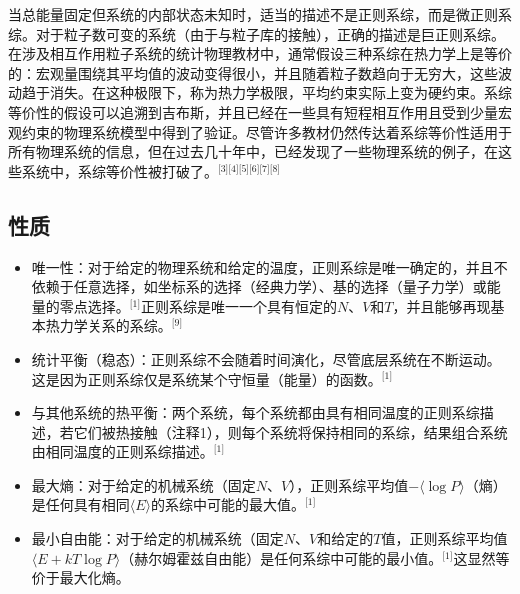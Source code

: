 当总能量固定但系统的内部状态未知时，适当的描述不是正则系综，而是微正则系综。对于粒子数可变的系统（由于与粒子库的接触），正确的描述是巨正则系综。在涉及相互作用粒子系统的统计物理教材中，通常假设三种系综在热力学上是等价的：宏观量围绕其平均值的波动变得很小，并且随着粒子数趋向于无穷大，这些波动趋于消失。在这种极限下，称为热力学极限，平均约束实际上变为硬约束。系综等价性的假设可以追溯到吉布斯，并且已经在一些具有短程相互作用且受到少量宏观约束的物理系统模型中得到了验证。尽管许多教材仍然传达着系综等价性适用于所有物理系统的信息，但在过去几十年中，已经发现了一些物理系统的例子，在这些系统中，系综等价性被打破了。\(^\text{[3][4][5][6][7][8]}\)
\subsection{性质}  
\begin{itemize}
\item 唯一性：对于给定的物理系统和给定的温度，正则系综是唯一确定的，并且不依赖于任意选择，如坐标系的选择（经典力学）、基的选择（量子力学）或能量的零点选择。\(^\text{[1]}\)正则系综是唯一一个具有恒定的\( N \)、\( V \)和\( T \)，并且能够再现基本热力学关系的系综。\(^\text{[9]}\)
\item 统计平衡（稳态）：正则系综不会随着时间演化，尽管底层系统在不断运动。这是因为正则系综仅是系统某个守恒量（能量）的函数。\(^\text{[1]}\)
\item 与其他系统的热平衡：两个系统，每个系统都由具有相同温度的正则系综描述，若它们被热接触（注释1），则每个系统将保持相同的系综，结果组合系统由相同温度的正则系综描述。\(^\text{[1]}\)
\item 最大熵：对于给定的机械系统（固定\( N \)、\( V \)），正则系综平均值\( -\langle \log P \rangle \)（熵）是任何具有相同\( \langle E \rangle \)的系综中可能的最大值。\(^\text{[1]}\)
\item 最小自由能：对于给定的机械系统（固定\( N \)、\( V \)和给定的\( T \)值，正则系综平均值\( \langle E + kT \log P \rangle \)（赫尔姆霍兹自由能）是任何系综中可能的最小值。\(^\text{[1]}\)这显然等价于最大化熵。
\end{itemize}